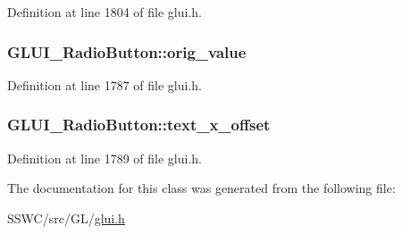 Definition at line 1804 of file glui.\+h.

\hypertarget{class_g_l_u_i___radio_button_aa874a5e29d93e5e65befd745d0e16454}{
\subsubsection[{orig\+\_\+value}]{ G\+L\+U\+I\+\_\+\+Radio\+Button\+::orig\+\_\+value}}\label{class_g_l_u_i___radio_button_aa874a5e29d93e5e65befd745d0e16454}


Definition at line 1787 of file glui.\+h.

\hypertarget{class_g_l_u_i___radio_button_a857d2387855fca92f0ae322e3f6fc19a}{
\subsubsection[{text\+\_\+x\+\_\+offset}]{ G\+L\+U\+I\+\_\+\+Radio\+Button\+::text\+\_\+x\+\_\+offset}}\label{class_g_l_u_i___radio_button_a857d2387855fca92f0ae322e3f6fc19a}


Definition at line 1789 of file glui.\+h.



The documentation for this class was generated from the following file\+:\begin{DoxyCompactItemize}
\item 
S\+S\+W\+C/src/\+G\+L/\hyperlink{glui_8h}{glui.\+h}\end{DoxyCompactItemize}
